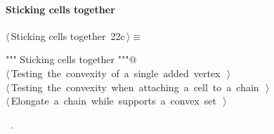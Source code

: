 \documentclass[11pt,oneside]{article}	%
\begin{document}
\paragraph{Sticking cells together}
\begin{flushleft} \small \label{scrap27}
\protect{}$\langle\,$Sticking cells together\nobreak\ {\footnotesize 22c}$\,\rangle\equiv$
\vspace{-1ex}
\begin{list}{}{} \item
\mbox{}\verb@""" Sticking cells together """@\\
\mbox{}\verb@@\hbox{$\langle\,$Testing the convexity of a single added vertex\nobreak\ {\footnotesize {}}$\,\rangle$}\verb@@\\
\mbox{}\verb@@\hbox{$\langle\,$Testing the convexity when attaching a cell to a chain\nobreak\ {\footnotesize {}}$\,\rangle$}\verb@@\\
\mbox{}\verb@@\hbox{$\langle\,$Elongate a chain while supports a convex set\nobreak\ {\footnotesize {}}$\,\rangle$}\verb@@\\
\mbox{}\verb@@{\NWsep}
\end{list}
\vspace{-1ex}
\footnotesize\addtolength{\baselineskip}{-1ex}
\begin{list}{}{\setlength{\itemsep}{-\parsep}\setlength{\itemindent}{-\leftmargin}}
\item \NWtxtMacroRefIn\ .
\end{list}
\end{flushleft}
\end{document}
